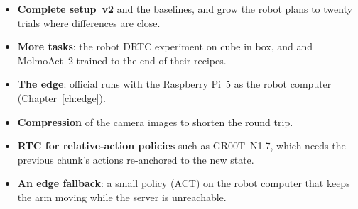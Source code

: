 \begin{itemize}
\item \textbf{Complete setup~v2} and the baselines, and grow the robot plans to twenty trials where differences are
      close.
\item \textbf{More tasks}: the robot DRTC experiment on cube in box, and \pizerofive{} and MolmoAct~2 trained to
      the end of their recipes.
\item \textbf{The edge}: official runs with the Raspberry Pi~5 as the robot computer (Chapter~\ref{ch:edge}).
\item \textbf{Compression} of the camera images to shorten the round trip.
\item \textbf{RTC for relative-action policies} such as GR00T~N1.7, which needs the previous chunk's actions re-anchored
      to the new state.
\item \textbf{An edge fallback}: a small policy (ACT) on the robot computer that keeps the arm moving while the server is
      unreachable.
\end{itemize}
